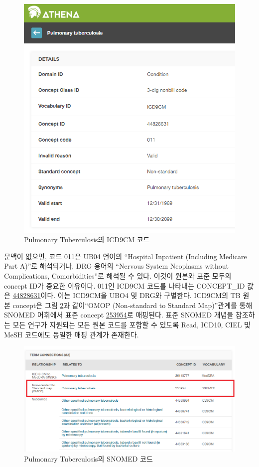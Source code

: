 \documentclass[11pt]{book}
\theoremstyle{definition}
\theoremstyle{definition}
\theoremstyle{definition}
\theoremstyle{remark}
\begin{document}
\begin{figure}

{\centering \includegraphics[width=0.75\linewidth]{images/CommonDataModel/pulmTubICD9} 

}

\caption{Pulmonary Tuberculosis의 ICD9CM 코드}\label{fig:pulmTubICD9}
\end{figure}

문맥이 없으면, 코드 011은 UB04 언어의 ``Hospital Inpatient (Including
Medicare Part A)''로 해석되거나, DRG 용어의 ``Nervous System Neoplasms
without Complications, Comorbidities''로 해석될 수 있다. 이것이 원본와
표준 모두의 concept ID가 중요한 이유이다. 011인 ICD9CM 코드를 나타내는
CONCEPT\_ID 값은
\href{http://athena.ohdsi.org/search-terms/terms/44828631}{44828631}이다.
이는 ICD9CM을 UBO4 및 DRG와 구별한다. ICD9CM의 TB 원본 concept은 그림
\ref{fig:pulmTubMap}과 같이``OMOP (Non-standard to Standard Map)''관계를
통해 SNOMED 어휘에서 표준 concept
\href{http://athena.ohdsi.org/search-terms/terms/253954}{253954}로
매핑된다. 표준 SNOMED 개념을 참조하는 모든 연구가 지원되는 모든 원본
코드를 포함할 수 있도록 Read, ICD10, CIEL 및 MeSH 코드에도 동일한 매핑
관계가 존재한다.

\begin{figure}

{\centering \includegraphics[width=1\linewidth]{images/CommonDataModel/pulmTubMap} 

}

\caption{Pulmonary Tuberculosis의 SNOMED 코드}\label{fig:pulmTubMap}
\end{figure}
\end{document}
